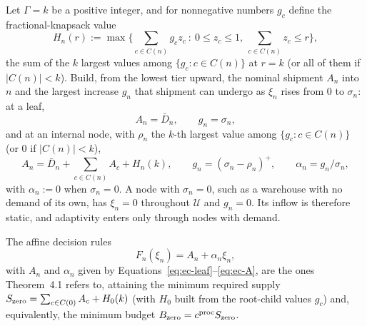\documentclass[11pt]{article}
\begin{document}
Let $\Gamma=k$ be a positive integer, and for nonnegative numbers $g_c$ define the fractional-knapsack value
\begin{equation}
H_n(r) := \max\Big\{ \textstyle\sum_{c\in C(n)}g_cz_c \ :\ 0\le z_c\le1,\ \sum_{c\in C(n)}z_c\le r \Big\},
\label{eq:ec-H}
\end{equation}
the sum of the $k$ largest values among $\{g_c:c\in C(n)\}$ at $r=k$ (or all of them if $|C(n)|<k$).
Build, from the lowest tier upward, the nominal shipment $A_n$ into $n$ and the largest increase $g_n$ that shipment can undergo as $\xi_n$ rises from $0$ to $\sigma_n$: at a leaf,
\begin{equation}
A_n = \bar D_n, \qquad g_n=\sigma_n,
\label{eq:ec-leaf}
\end{equation}
and at an internal node, with $\rho_n$ the $k$-th largest value among $\{g_c:c\in C(n)\}$ (or $0$ if $|C(n)|<k$),
\begin{equation}
A_n = \bar D_n + \textstyle\sum_{c\in C(n)}A_c + H_n(k), \qquad
g_n = (\sigma_n-\rho_n)^+, \qquad \alpha_n = g_n/\sigma_n,
\label{eq:ec-A}
\end{equation}
with $\alpha_n := 0$ when $\sigma_n = 0$.
A node with $\sigma_n = 0$, such as a warehouse with no demand of its own, has $\xi_n = 0$ throughout $\mathcal U$ and $g_n = 0$.
Its inflow is therefore static, and adaptivity enters only through nodes with demand.

The affine decision rules
\begin{equation}
F_n(\xi_n) = A_n+\alpha_n\xi_n,
\label{eq:ec-adr-tree}
\end{equation}
with $A_n$ and $\alpha_n$ given by Equations~\ref{eq:ec-leaf}--\ref{eq:ec-A}, are the ones Theorem~4.1 refers to, attaining the minimum required supply $S_{\rm zero} = \sum_{c\in C(0)}A_c+H_0(k)$ (with $H_0$ built from the root-child values $g_c$) and, equivalently, the minimum budget $B_{\rm zero}=c^{\text{proc}}S_{\rm zero}$.
\end{document}
